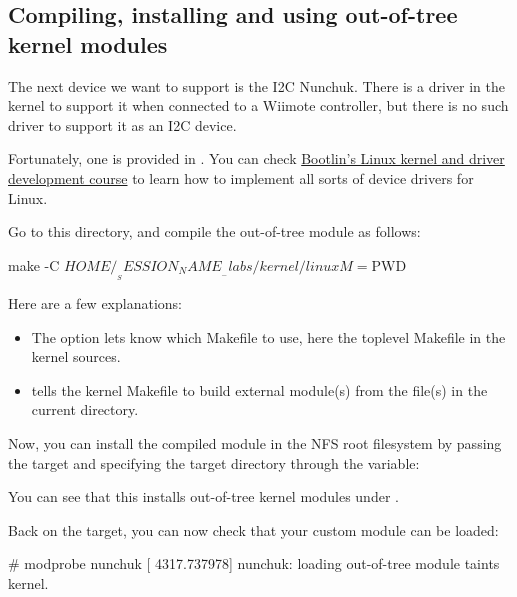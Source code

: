 \subsection{Compiling, installing and using out-of-tree kernel modules}

The next device we want to support is the I2C Nunchuk. There is a driver
in the kernel to support it when connected to a Wiimote controller, but
there is no such driver to support it as an I2C device.

Fortunately, one is provided in
. You can check
\href{https://bootlin.com/training/kernel/}{Bootlin's Linux kernel and
driver development course} to learn how to implement all sorts of device
drivers for Linux.

Go to this directory, and compile the out-of-tree module as follows:

\begin{bashinput}
make -C $HOME/__SESSION_NAME__-labs/kernel/linux M=$PWD
\end{bashinput}

Here are a few explanations:
\begin{itemize}
\item The  option lets  know which Makefile to
      use, here the toplevel Makefile in the kernel sources.
\item {} tells the kernel Makefile to build external
      module(s) from the file(s) in the current directory.
\end{itemize}

Now, you can install the compiled module in the NFS root filesystem
by passing the  target and specifying the
target directory through the  variable:


You can see that this installs out-of-tree kernel modules under
.

Back on the target, you can now check that your custom module can
be loaded:

\begin{bashinput}
# modprobe nunchuk
[ 4317.737978] nunchuk: loading out-of-tree module taints kernel.
\end{bashinput}

